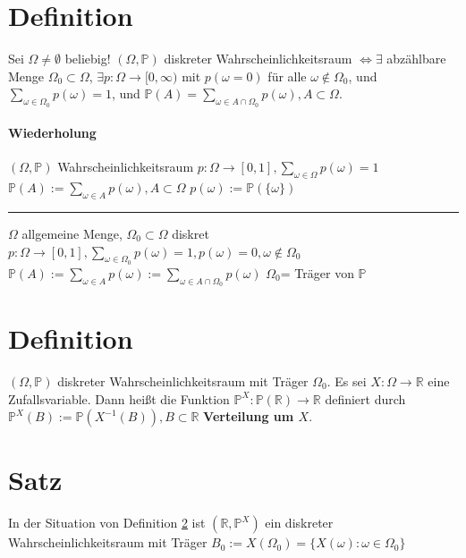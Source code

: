 \documentclass[a4paper,11pt,notitlepage]{report}
\newcommand{\R}{{\ensuremath{\mathbb{R}}}}
\newcommand{\Prim}{{\ensuremath{\mathbb{P}}}}
\begin{document}
\section{Definition}
Sei $\Omega \neq \emptyset$ beliebig!
$(\Omega, \Prim)$ diskreter Wahrscheinlichkeitsraum $\Leftrightarrow \exists$ abzählbare Menge $\Omega_0 \subset \Omega$, $\exists p \colon \Omega \rightarrow [0, \infty)$ mit $p(\omega=0)$ für alle $\omega \notin \Omega_0$, und $\sum\limits_{\omega \in \Omega_0}{p(\omega)} = 1$, und $\Prim(A) = \sum \limits_{\omega \in A \cap \Omega_0}{p(\omega)}, A \subset \Omega$.

\paragraph{Wiederholung}
$(\Omega, \Prim)$ Wahrscheinlichkeitsraum
\newline
$p \colon \Omega \rightarrow [0,1], \sum\limits_{\omega \in \Omega}{p(\omega)} = 1$
\newline
$\Prim(A):=\sum\limits_{\omega \in A}{p(\omega)}, A \subset \Omega$
\newline
$p(\omega) := \Prim(\{\omega\})$
\newline
\hrule
\vspace{10pt}
$\Omega$ allgemeine Menge, $\Omega_0 \subset \Omega$ diskret
\newline
$p \colon \Omega \rightarrow [0,1], \sum\limits_{\omega \in \Omega_0}{p(\omega)}=1, p(\omega) = 0, \omega \notin \Omega_0$
\newline
$\Prim(A):= \sum\limits_{\omega \in A}{p(\omega)}:=\sum\limits_{\omega \in A \cap \Omega_0}{p(\omega)}$
\newline
$\Omega_0$= Träger von $\Prim$

\section{Definition}
\label{defVerteilung}
$(\Omega, \Prim)$ diskreter Wahrscheinlichkeitsraum  mit Träger $\Omega_0$.
Es sei $X \colon \Omega \rightarrow \R$ eine Zufallsvariable.
Dann heißt die Funktion $\Prim^X \colon \Prim(\R) \rightarrow \R$ definiert durch 
$\Prim^X(B):= \Prim\left(X^{-1}(B)\right), B \subset \R$ \textbf{Verteilung um $X$}.

\section{Satz}
In der Situation von Definition \ref{defVerteilung} ist $(\R,\Prim^X)$ ein diskreter Wahrscheinlichkeitsraum mit Träger $B_0 := X(\Omega_0) = \{X(\omega) \colon \omega \in \Omega_0 \}$ 
\end{document}
